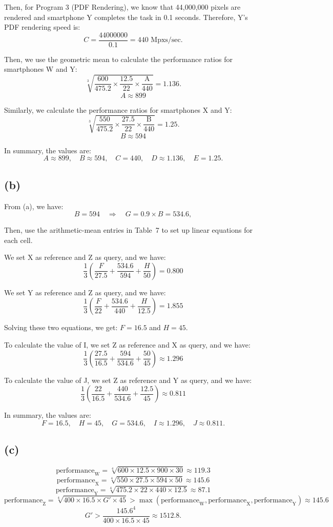 \documentclass[12pt]{article}
\begin{document}
Then, for Program 3 (PDF Rendering), we know that 44,000,000 pixels are rendered and smartphone Y completes the task in 0.1 seconds. Therefore, Y's PDF rendering speed is:
$$
C = \frac{44000000}{0.1} = 440\text{ Mpxs/sec}.
$$

Then, we use the geometric mean to calculate the performance ratios for smartphones W and Y:
$$
\sqrt[3]{\frac{600}{475.2} \times \frac{12.5}{22} \times \frac{\text{A}}{440}} = 1.136.
$$
$$
A \approx 899
$$

Similarly, we calculate the performance ratios for smartphones X and Y:
$$
\sqrt[3]{\frac{550}{475.2} \times \frac{27.5}{22} \times \frac{\text{B}}{440}} = 1.25.
$$
$$
B \approx 594
$$

In summary, the values are:
$$
A \approx 899, \quad B \approx 594, \quad C = 440, \quad D \approx 1.136, \quad E = 1.25.
$$


\subsection*{(b)}
From (a), we have:
$$
B = 594 \quad\Longrightarrow\quad G = 0.9 \times B = 534.6,
$$

Then, use the arithmetic-mean entries in Table~7 to set up linear equations for each cell.

We set X as reference and Z as query, and we have:
$$
\frac{1}{3}\left(\frac{F}{27.5} + \frac{534.6}{594} + \frac{H}{50}\right) = 0.800
$$

We set Y as reference and Z as query, and we have:
$$
\frac{1}{3}\left(\frac{F}{22} + \frac{534.6}{440} + \frac{H}{12.5}\right) = 1.855
$$

Solving these two equations, we get: $F = 16.5$ and $H = 45$.

To calculate the value of I, we set Z as reference and X as query, and we have:
$$
\frac{1}{3}\left(\frac{27.5}{16.5} + \frac{594}{534.6} + \frac{50}{45}\right) \approx 1.296
$$

To calculate the value of J, we set Z as reference and Y as query, and we have:
$$
\frac{1}{3}\left(\frac{22}{16.5} + \frac{440}{534.6} + \frac{12.5}{45}\right) \approx 0.811
$$

In summary, the values are:
$$
F = 16.5, \quad H = 45, \quad G = 534.6, \quad I \approx 1.296, \quad J \approx 0.811.
$$

\subsection*{(c)}
$$
\text{performance}_{\text{W}} = \sqrt[4]{600 \times 12.5 \times 900 \times 30} \approx 119.3
$$
$$
\text{performance}_{\text{X}} = \sqrt[4]{550 \times 27.5 \times 594 \times 50}  \approx 145.6
$$
$$
\text{performance}_{\text{Y}} = \sqrt[4]{475.2 \times 22 \times 440 \times 12.5} \approx 87.1
$$
$$
\text{performance}_{\text{Z}} = \sqrt[4]{400 \times 16.5 \times G' \times 45} > \max(\text{performance}_{\text{W}}, \text{performance}_{\text{X}}, \text{performance}_{\text{Y}}) \approx 145.6
$$
$$
G' > \frac{145.6^4}{400 \times 16.5 \times 45} \approx 1512.8.
$$
\end{document}
